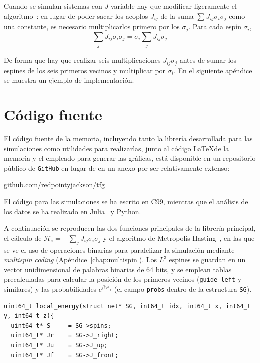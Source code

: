 \documentclass[11pt]{report}
\newcommand{\Ham}{\mathscr{H}}
\begin{document}
\begin{appendices}
Cuando se simulan sistemas con $J$ variable hay que modificar
ligeramente el algoritmo~\cite{multispincoding}: en lugar de poder
sacar los acoplos $J_{ij}$ de la suma $\sum_{} J_{ij}σ_iσ_j$ como una
constante, es necesario multiplicarlos primero por los $σ_j$. Para
cada espín $σ_i$,
\begin{equation}
  \sum_{j} J_{ij} σ_i σ_j = σ_i \sum_{j} J_{ij} σ_j
\end{equation}

De forma que hay que realizar seis multiplicaciones $J_{ij}σ_j$ antes
de sumar los espines de los seis primeros vecinos y multiplicar por
$σ_i$. En el siguiente apéndice se muestra un ejemplo de implementación.

\chapter{Código fuente}
El código fuente de la memoria, incluyendo tanto la librería
desarrollada para las simulaciones como utilidades para realizarlas,
junto al código \LaTeX de la memoria y el empleado para generar las
gráficas, está disponible en un repositorio público de \texttt{GitHub}
en lugar de en un anexo por ser relativamente extenso:
\begin{flushright}
  \url{github.com/redpointyjackson/tfg}
\end{flushright}

El código para las simulaciones se ha escrito en C99, mientras que el
análisis de los datos se ha realizado en Julia~\cite{julialang} y Python.

A continuación se reproducen las dos funciones principales de la
librería principal, el cálculo de $\Ham_i = -\sum_{j} J_{ij} σ_i σ_j$
y el algoritmo de Metropolis-Hasting~\cite{metropolis}, en las que se
ve el uso de operaciones binarias para paralelizar la simulación
mediante \textit{multispin coding} (Apéndice~\ref{chap:multispin}).
Los $L^3$ espines se guardan en un vector unidimensional de palabras
binarias de 64 bits, y se emplean tablas precalculadas para calcular
la posición de los primeros vecinos (\texttt{guide\_left} y similares)
y las probabilidades $e^{β \Ham_i}$ (el campo \texttt{probs} dentro de
la estructura \texttt{SG}).

\vspace{1cm}

\begin{verbatim}
uint64_t local_energy(struct net* SG, int64_t idx, int64_t x, int64_t y, int64_t z){
  uint64_t* S     = SG->spins;
  uint64_t* Jr    = SG->J_right;
  uint64_t* Ju    = SG->J_up;
  uint64_t* Jf    = SG->J_front;


\end{verbatim}
\end{appendices}
\end{document}
